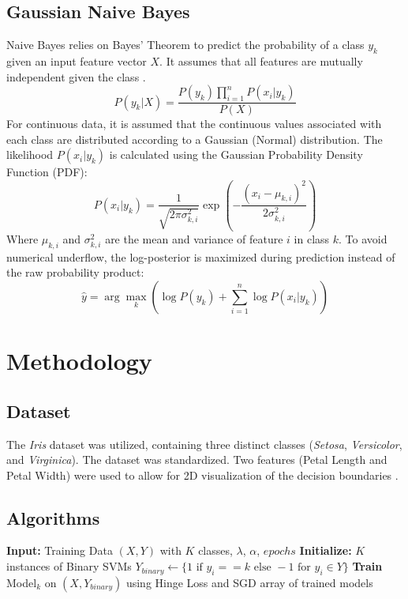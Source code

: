 \documentclass[11pt]{article}
\begin{document}
\subsection{Gaussian Naive Bayes}
Naive Bayes relies on Bayes' Theorem to predict the probability of a class $y_k$ given an input feature vector $X$. It assumes that all features are mutually independent given the class \cite{hastie2009elements}.
\begin{equation}
    P(y_k | X) = \frac{P(y_k) \prod_{i=1}^{n} P(x_i | y_k)}{P(X)}
\end{equation}
For continuous data, it is assumed that the continuous values associated with each class are distributed according to a Gaussian (Normal) distribution. The likelihood $P(x_i | y_k)$ is calculated using the Gaussian Probability Density Function (PDF):
\begin{equation}
    P(x_i | y_k) = \frac{1}{\sqrt{2\pi\sigma_{k,i}^2}} \exp\left(-\frac{(x_i - \mu_{k,i})^2}{2\sigma_{k,i}^2}\right)
\end{equation}
Where $\mu_{k,i}$ and $\sigma_{k,i}^2$ are the mean and variance of feature $i$ in class $k$. To avoid numerical underflow, the log-posterior is maximized during prediction instead of the raw probability product:
\begin{equation}
    \hat{y} = \arg\max_k \left( \log P(y_k) + \sum_{i=1}^{n} \log P(x_i | y_k) \right)
\end{equation}

\section{Methodology}

\subsection{Dataset}
The \textit{Iris} dataset was utilized, containing three distinct classes (\textit{Setosa}, \textit{Versicolor}, and \textit{Virginica}). The dataset was standardized. Two features (Petal Length and Petal Width) were used to allow for 2D visualization of the decision boundaries \cite{fisher1936use}.

\subsection{Algorithms}

\begin{algorithm}[H]
    \caption{Multi-Class SVM (One-vs-Rest Training via SGD)}
    \begin{algorithmic}[1]
        \State \textbf{Input:} Training Data $(X, Y)$ with $K$ classes, $\lambda$, $\alpha$, $epochs$
        \State \textbf{Initialize:} $K$ instances of Binary SVMs
        \State $Y_{binary} \gets \{1 \text{ if } y_i == k \text{ else } -1 \text{ for } y_i \in Y\}$
        \State \textbf{Train} Model$_k$ on $(X, Y_{binary})$ using Hinge Loss and SGD
        \EndFor
        \State \Return array of trained models
    \end{algorithmic}
\end{algorithm}
\end{document}
